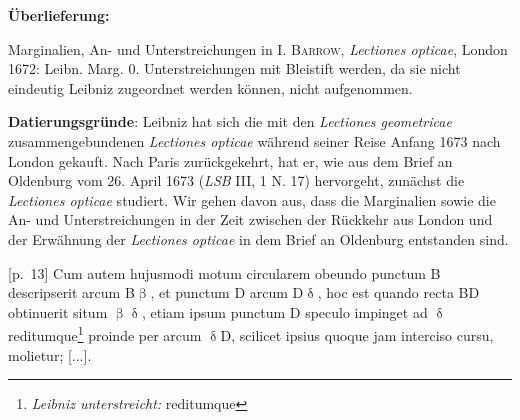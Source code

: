       
               
                \begin{ledgroupsized}[r]{120mm}
                \footnotesize 
                \pstart                
                \noindent\textbf{\"{U}berlieferung:}   
                \pend
                \end{ledgroupsized}
            
              
                            \begin{ledgroupsized}[r]{114mm}
                            \footnotesize 
                            \pstart \parindent -6mm
                            Marginalien, An- und Unterstreichungen in \textsc{I. Barrow}, \textit{Lectiones opticae}, London 1672: Leibn. Marg. 0. Unterstreichungen mit Bleistift werden, da sie nicht eindeutig Leibniz zugeordnet werden k\"{o}nnen, nicht aufgenommen. \pend
                            \end{ledgroupsized}
                \vspace*{5mm}
                \begin{ledgroup}
                \footnotesize 
                \pstart
            \noindent\footnotesize{\textbf{Datierungsgr\"{u}nde}: Leibniz hat sich die mit den \cite{00144}\textit{Lectiones geometricae} zusammengebundenen \cite{00144}\textit{Lectiones opticae} w\"{a}hrend seiner Reise Anfang 1673 nach London gekauft. Nach Paris zur\"{u}ckgekehrt, hat er, wie aus dem Brief an Oldenburg vom 26. April 1673 (\textit{LSB} III, 1 N. 17) hervorgeht, zun\"{a}chst die \cite{00144}\textit{Lectiones opticae} studiert. Wir gehen davon aus, dass die Marginalien sowie die An- und Unterstreichungen in der Zeit zwischen der R\"{u}ckkehr aus London und der Erw\"{a}hnung der \cite{00144}\textit{Lectiones opticae} in dem Brief an Oldenburg entstanden sind.}
                \pend
                \end{ledgroup}
            
                \vspace*{8mm}
                \pstart 
                \normalsize
             [p.~13] Cum autem hujusmodi motum circularem obeundo punctum B descripserit arcum B$\upbeta$, et punctum D arcum D$\updelta$, hoc est quando recta BD obtinuerit situm $\upbeta$$\updelta$, etiam ipsum punctum D speculo\protect{} impinget ad $\updelta$ reditumque\footnote{\textit{Leibniz unterstreicht:} reditumque} proinde per arcum $\updelta$D, scilicet ipsius quoque jam interciso cursu, molietur; [...].
            \pend